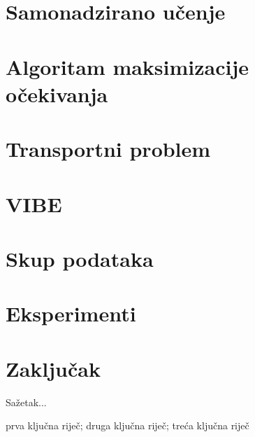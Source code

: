 \documentclass[diplomskirad]{fer}
\begin{document}
\chapter{Samonadzirano učenje}
\label{pog:samonadzirano}


\chapter{Algoritam maksimizacije očekivanja}
\label{pog:em_algoritam}


\chapter{Transportni problem}
\label{pog:transport}


\chapter{VIBE}
\label{pog:vibe}


\chapter{Skup podataka}
\label{pog:skup}


\chapter{Eksperimenti}
\label{pog:eksperimenti}


\chapter{Zaključak}
\label{pog:zakljucak}







\begin{sazetak}
  Sažetak...
\end{sazetak}

\begin{kljucnerijeci}
  prva ključna riječ; druga ključna riječ; treća ključna riječ
\end{kljucnerijeci}
\end{document}

